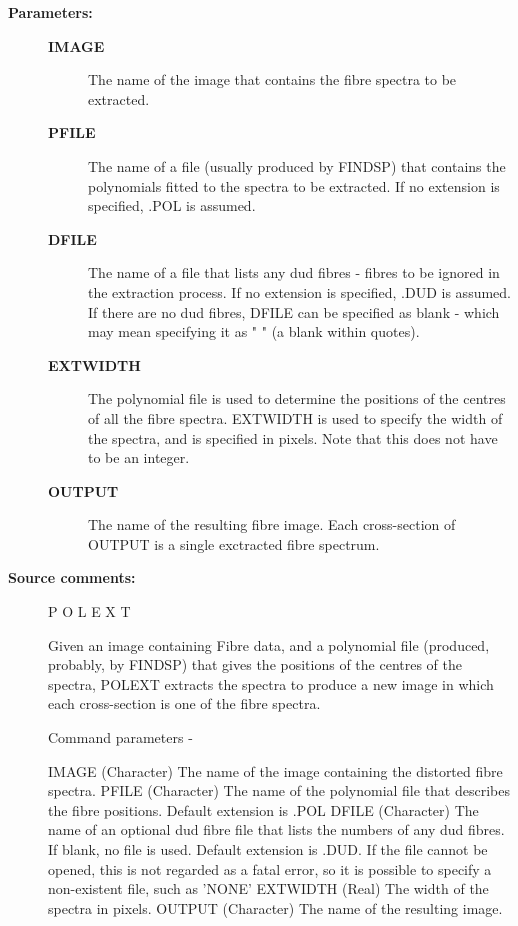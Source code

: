 \begin{description}
\begin{description}
\item [\textbf{Parameters:}]
\begin{description}
\item [\textbf{IMAGE}]
 The name of the image that contains the fibre
 spectra to be extracted.
\item [\textbf{PFILE}]
 The name of a file (usually produced by
 FINDSP) that contains the polynomials fitted to the
 spectra to be extracted.  If no extension is specified,
 .POL is assumed.
\item [\textbf{DFILE}]
 The name of a file that lists any dud fibres - fibres to
 be ignored in the extraction process.  If no extension is
 specified, .DUD is assumed.  If there are no dud fibres,
 DFILE can be specified as blank - which may mean specifying
 it as " " (a blank within quotes).
\item [\textbf{EXTWIDTH}]
 The polynomial file is used to determine the positions of
 the centres of all the fibre spectra.  EXTWIDTH is used to
 specify the width of the spectra, and is specified in
 pixels.  Note that this does not have to be an integer.
\item [\textbf{OUTPUT}]
 The name of the resulting fibre image.  Each
 cross-section of OUTPUT is a single exctracted fibre
 spectrum.
\end{description}

\item [\textbf{Source comments:}]
\begin{terminalv}
 P O L E X T

 Given an image containing Fibre data, and a polynomial file
 (produced, probably, by FINDSP) that gives the positions of the
 centres of the spectra, POLEXT extracts the spectra to produce
 a new image in which each cross-section is one of the fibre
 spectra.

 Command parameters -

 IMAGE     (Character) The name of the image containing the
           distorted fibre spectra.
 PFILE     (Character) The name of the polynomial file that
           describes the fibre positions.  Default extension
           is .POL
 DFILE     (Character) The name of an optional dud fibre file
           that lists the numbers of any dud fibres.  If blank,
           no file is used.  Default extension is .DUD.  If the
           file cannot be opened, this is not regarded as a
           fatal error, so it is possible to specify a
           non-existent file, such as 'NONE'
 EXTWIDTH  (Real) The width of the spectra in pixels.
 OUTPUT    (Character) The name of the resulting image.


\end{terminalv}
\end{description}
\end{description}

